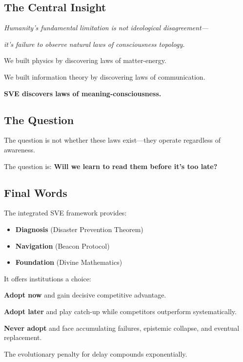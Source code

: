 \documentclass[11pt,a4paper]{article}
\theoremstyle{definition}
\theoremstyle{remark}
\begin{document}
\subsection{The Central Insight}

\begin{center}
\large
\textit{Humanity's fundamental limitation is not ideological disagreement—}

\textit{it's failure to observe natural laws of consciousness topology.}
\end{center}

We built physics by discovering laws of matter-energy.

We built information theory by discovering laws of communication.

\textbf{SVE discovers laws of meaning-consciousness.}

\subsection{The Question}

The question is not whether these laws exist—they operate regardless of awareness.

The question is: \textbf{Will we learn to read them before it's too late?}

\subsection{Final Words}

The integrated SVE framework provides:
\begin{itemize}
\item \textbf{Diagnosis} (Disaster Prevention Theorem)
\item \textbf{Navigation} (Beacon Protocol)
\item \textbf{Foundation} (Divine Mathematics)
\end{itemize}

It offers institutions a choice:

\textbf{Adopt now} and gain decisive competitive advantage.

\textbf{Adopt later} and play catch-up while competitors outperform systematically.

\textbf{Never adopt} and face accumulating failures, epistemic collapse, and eventual replacement.

The evolutionary penalty for delay compounds exponentially.

\bigskip
\end{document}
